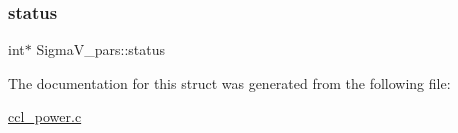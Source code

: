 \subsubsection{\texorpdfstring{status}{status}}
{\footnotesize\ttfamily int$\ast$ Sigma\+V\+\_\+pars\+::status}



The documentation for this struct was generated from the following file\+:\begin{DoxyCompactItemize}
\item 
\mbox{\hyperlink{ccl__power_8c}{ccl\+\_\+power.\+c}}\end{DoxyCompactItemize}

